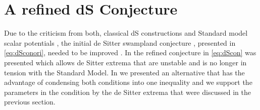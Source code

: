 \documentclass[12pt]{report}
\begin{document}
\section{A refined dS Conjecture}
\label{sec:refconj}
Due to the criticism from both, classical dS constructions \cite{Andriot:2018ept,Roupec:2018mbn} and Standard model scalar potentials \cite{Denef:2018etk,Murayama:2018lie,Choi:2018rze,Hamaguchi:2018vtv}, the initial de Sitter swampland conjecture \cite{Obied:2018sgi}, presented in \eqref{eq:dSconori}, needed to be improved \cite{Andriot:2018wzk,Garg:2018reu}. In \cite{Ooguri:2018wrx} the refined conjecture in \eqref{eq:dScon} was presented which allows de Sitter extrema that are unstable and is no longer in tension with the Standard Model. In \cite{Andriot:2018mav} we presented an alternative that has the advantage of condensing both conditions into one inequality and we support the parameters in the condition by the de Sitter extrema that were discussed in the previous section.
\end{document}
